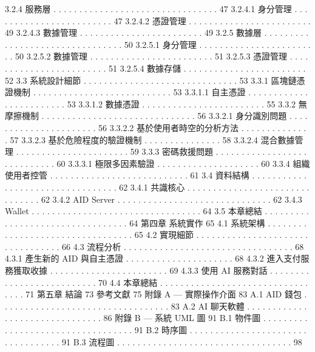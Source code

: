 3.2.4 服務層 . . . . . . . . . . . . . . . . . . . . . . . . . . . . . . . . 47
3.2.4.1 身分管理 . . . . . . . . . . . . . . . . . . . . . . . . 47
3.2.4.2 憑證管理 . . . . . . . . . . . . . . . . . . . . . . . . 49
3.2.4.3 數據管理 . . . . . . . . . . . . . . . . . . . . . . . . 49
3.2.5 數據層 . . . . . . . . . . . . . . . . . . . . . . . . . . . . . . . . 50
3.2.5.1 身分管理 . . . . . . . . . . . . . . . . . . . . . . . . 50
3.2.5.2 數據管理 . . . . . . . . . . . . . . . . . . . . . . . . 51
3.2.5.3 憑證管理 . . . . . . . . . . . . . . . . . . . . . . . . 51
3.2.5.4 數據存儲 . . . . . . . . . . . . . . . . . . . . . . . . 52
3.3 系統設計細節 . . . . . . . . . . . . . . . . . . . . . . . . . . . . . . 53
3.3.1 區塊鏈憑證機制 . . . . . . . . . . . . . . . . . . . . . . . . . . . 53
3.3.1.1 自主憑證 . . . . . . . . . . . . . . . . . . . . . . . . 53
3.3.1.2 數據憑證 . . . . . . . . . . . . . . . . . . . . . . . . 55
3.3.2 無摩擦機制 . . . . . . . . . . . . . . . . . . . . . . . . . . . . . . 56
3.3.2.1 身分識別問題 . . . . . . . . . . . . . . . . . . . . . . 56
3.3.2.2 基於使用者時空的分析方法 . . . . . . . . . . . . . . 57
3.3.2.3 基於危險程度的驗證機制 . . . . . . . . . . . . . . . 58
3.3.2.4 混合數據管理 . . . . . . . . . . . . . . . . . . . . . . 59
3.3.3 密碼救援問題 . . . . . . . . . . . . . . . . . . . . . . . . . . . . 60
3.3.3.1 極限多因素驗證 . . . . . . . . . . . . . . . . . . . . 60
3.3.4 組織使用者控管 . . . . . . . . . . . . . . . . . . . . . . . . . . . 61
3.4 資料結構 . . . . . . . . . . . . . . . . . . . . . . . . . . . . . . . . . 62
3.4.1 共識核心 . . . . . . . . . . . . . . . . . . . . . . . . . . . . . . . 62
3.4.2 AID Server . . . . . . . . . . . . . . . . . . . . . . . . . . . . . . 62
3.4.3 Wallet . . . . . . . . . . . . . . . . . . . . . . . . . . . . . . . . . 64
3.5 本章總結 . . . . . . . . . . . . . . . . . . . . . . . . . . . . . . . . . 64
第四章 系統實作 65
4.1 系統架構 . . . . . . . . . . . . . . . . . . . . . . . . . . . . . . . . . 65
4.2 實現細節 . . . . . . . . . . . . . . . . . . . . . . . . . . . . . . . . . 66
4.3 流程分析 . . . . . . . . . . . . . . . . . . . . . . . . . . . . . . . . . 68
4.3.1 產生新的 AID 與自主憑證 . . . . . . . . . . . . . . . . . . . . . 68
4.3.2 進入支付服務獲取收據 . . . . . . . . . . . . . . . . . . . . . . . 69
4.3.3 使用 AI 服務對話 . . . . . . . . . . . . . . . . . . . . . . . . . . 70
4.4 本章總結 . . . . . . . . . . . . . . . . . . . . . . . . . . . . . . . . . 71
第五章 結論 73
參考文獻 75
附錄 A — 實際操作介面 83
A.1 AID 錢包 . . . . . . . . . . . . . . . . . . . . . . . . . . . . . . . . . 83
A.2 AI 聊天軟體 . . . . . . . . . . . . . . . . . . . . . . . . . . . . . . . 86
附錄 B — 系統 UML 圖 91
B.1 物件圖 . . . . . . . . . . . . . . . . . . . . . . . . . . . . . . . . . . 91
B.2 時序圖 . . . . . . . . . . . . . . . . . . . . . . . . . . . . . . . . . . 91
B.3 流程圖 . . . . . . . . . . . . . . . . . . . . . . . . . . . . . . . . . . 98